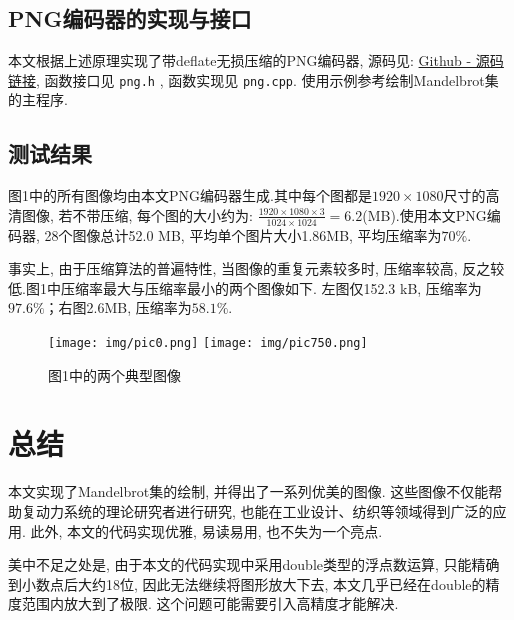 \documentclass[UTF8]{ctexart}
\begin{document}
\subsection{PNG编码器的实现与接口}

本文根据上述原理实现了带deflate无损压缩的PNG编码器, 源码见: \href{https://Github.com/EbolaEmperor/MathSoftware/tree/main/Homework-4}{Github - 源码链接}, 函数接口见 \verb |png.h| , 函数实现见 \verb |png.cpp|. 使用示例参考绘制Mandelbrot集的主程序. 

\subsection{测试结果}

图1中的所有图像均由本文PNG编码器生成.其中每个图都是$1920\times 1080$尺寸的高清图像, 若不带压缩, 每个图的大小约为: $\frac{1920\times 1080\times 3}{1024\times 1024}=6.2$(MB).使用本文PNG编码器, 28个图像总计52.0 MB, 平均单个图片大小1.86MB, 平均压缩率为$70\%$.

事实上, 由于压缩算法的普遍特性, 当图像的重复元素较多时, 压缩率较高, 反之较低.图1中压缩率最大与压缩率最小的两个图像如下. 左图仅152.3 kB, 压缩率为$97.6\%$；右图2.6MB, 压缩率为$58.1\%$.

\begin{figure}[H]
    \centering
    \texttt{[image: img/pic0.png]}
    \hspace{15mm}
    \texttt{[image: img/pic750.png]}
    \caption{图1中的两个典型图像}
\end{figure}

\section{总结}

本文实现了Mandelbrot集的绘制, 并得出了一系列优美的图像. 这些图像不仅能帮助复动力系统的理论研究者进行研究, 也能在工业设计、纺织等领域得到广泛的应用. 此外, 本文的代码实现优雅, 易读易用, 也不失为一个亮点. 

美中不足之处是, 由于本文的代码实现中采用double类型的浮点数运算, 只能精确到小数点后大约18位, 因此无法继续将图形放大下去, 本文几乎已经在double的精度范围内放大到了极限. 这个问题可能需要引入高精度才能解决. 



\end{document}
